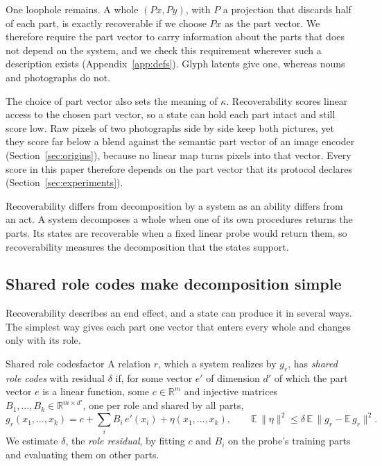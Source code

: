 \documentclass[10pt]{article}
\theoremstyle{plain}
\theoremstyle{remark}
\newcommand{\R}{\mathbb{R}}
\begin{document}
One loophole remains. A whole $(Px, Py)$, with $P$ a projection that discards half of each part, is exactly recoverable if we choose $Px$ as the part vector. We therefore require the part vector to carry information about the parts that does not depend on the system, and we check this requirement wherever such a description exists (Appendix~\ref{app:defs}). Glyph latents give one, whereas nouns and photographs do not.

The choice of part vector also sets the meaning of $\kappa$. Recoverability scores linear access to the chosen part vector, so a state can hold each part intact and still score low. Raw pixels of two photographs side by side keep both pictures, yet they score far below a blend against the semantic part vector of an image encoder (Section~\ref{sec:origins}), because no linear map turns pixels into that vector. Every score in this paper therefore depends on the part vector that its protocol declares (Section~\ref{sec:experiments}).

Recoverability differs from decomposition by a system as an ability differs from an act. A system decomposes a whole when one of its own procedures returns the parts. Its states are recoverable when a fixed linear probe would return them, so recoverability measures the decomposition that the states support.

\subsection{Shared role codes make decomposition simple}
\label{sec:mechanics}

Recoverability describes an end effect, and a state can produce it in several ways. The simplest way gives each part one vector that enters every whole and changes only with its role.

\begin{defbox}{Shared role codes}{factor}
A relation $r$, which a system realizes by $g_r$, has \emph{shared role codes} with residual $\delta$ if, for some vector $e'$ of dimension $d'$ of which the part vector $e$ is a linear function, some $c \in \R^m$ and injective matrices $B_1, \ldots, B_k \in \R^{m \times d'}$, one per role and shared by all parts,
\begin{equation}
  g_r(x_1, \ldots, x_k) = c + \textstyle\sum_{i} B_i\, e'(x_i) + \eta(x_1, \ldots, x_k), \qquad \mathbb{E}\,\lVert \eta \rVert^2 \le \delta\, \mathbb{E}\,\lVert g_r - \mathbb{E}\,g_r \rVert^2 .
  \label{eq:factor}
\end{equation}
We estimate $\delta$, the \emph{role residual}, by fitting $c$ and $B_i$ on the probe's training parts and evaluating them on other parts.
\end{defbox}
\end{document}
